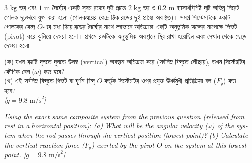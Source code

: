 \documentclass[12pt, a4paper]{article}
\begin{document}
\begin{tcolorbox}[questionbox={প্রশ্ন (Question) 5}]
\noindent
$3\text{ kg}$ ভর এবং $1\text{ m}$ দৈর্ঘ্যের একটি সুষম রডের দুই প্রান্তে $2\text{ kg}$ ভর ও $0.2\text{ m}$ ব্যাসার্ধবিশিষ্ট দুটি অভিন্ন নিরেট গোলক দৃঢ়ভাবে যুক্ত করা হলো (গোলকদ্বয়ের কেন্দ্র ঠিক রডের দুই প্রান্তে অবস্থিত)। সমগ্র সিস্টেমটিকে একটি গোলকের কেন্দ্র $O$-এর মধ্য দিয়ে রডের দৈর্ঘ্যের সাথে লম্বভাবে অতিক্রান্ত একটি অনুভূমিক অক্ষের সাপেক্ষে পিভট (pivot) করে ঝুলিয়ে দেওয়া হলো। প্রথমে রডটিকে অনুভূমিক অবস্থানে স্থির রাখা হয়েছিল এবং সেখান থেকে ছেড়ে দেওয়া হলো। 

\vspace{0.3em}
\noindent
(ক) যখন রডটি দুলতে দুলতে উলম্ব (vertical) অবস্থান অতিক্রম করে (সর্বনিম্ন বিন্দুতে পৌঁছায়), তখন সিস্টেমটির কৌণিক বেগ ($\omega$) কত হবে? \\
(খ) এই সর্বনিম্ন বিন্দুতে পিভট বা ঘূর্ণন বিন্দু $O$ কর্তৃক সিস্টেমটির ওপর প্রযুক্ত ঊর্ধ্বমুখী প্রতিক্রিয়া বল ($F_y$) কত হবে? \\
\textit{[$g = 9.8\text{ m/s}^2$]}

\vspace{0.8em}
\begin{english}
\noindent\textit{\color{darkgray}
Using the exact same composite system from the previous question (released from rest in a horizontal position): (a) What will be the angular velocity ($\omega$) of the system when the rod passes through the vertical position (lowest point)? (b) Calculate the vertical reaction force ($F_y$) exerted by the pivot $O$ on the system at this lowest point. [$g = 9.8\text{ m/s}^2$]
}
\end{english}
\end{tcolorbox}
\end{document}
